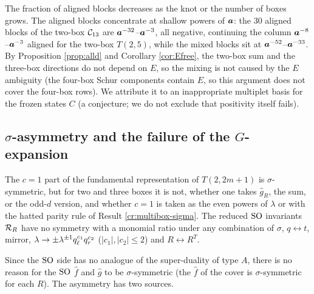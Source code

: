 The fraction of aligned blocks decreases as the knot or the number of boxes grows. The aligned blocks concentrate at shallow powers of $\bm{a}$: the 30 aligned blocks of the two-box $\mathcal{C}_{13}$ are $\bm{a}^{-32}$--$\bm{a}^{-3}$, all negative, continuing the column $\bm{a}^{-8}$--$\bm{a}^{-3}$ aligned for the two-box $T(2,5)$, while the mixed blocks sit at $\bm{a}^{-52}$--$\bm{a}^{-33}$.
By Proposition \ref{prop:alld} and Corollary \ref{cor:Efree}, the two-box sum and the three-box directions do not depend on $E$, so the mixing is not caused by the $E$ ambiguity (the four-box Schur components contain $E$, so this argument does not cover the four-box rows). We attribute it to an inappropriate multiplet basis for the frozen states $C$ (a conjecture; we do not exclude that positivity itself fails).

\subsection{\texorpdfstring{$\sigma$}{sigma}-asymmetry and the failure of the \texorpdfstring{$G$}{G}-expansion}\label{sec:sigmaasym}
\begin{result}\label{cr:noG}
The $c = 1$ part of the fundamental representation of $T(2,2m+1)$ is $\sigma$-symmetric, but for two and three boxes it is not, whether one takes $\hat g_R$, the sum, or the odd-$d$ version, and whether $c = 1$ is taken as the even powers of $\lambda$ or with the hatted parity rule of Result \ref{cr:multibox-sigma}. The reduced $\mathrm{SO}$ invariants $\mathcal{R}_R$ have no symmetry with a monomial ratio under any combination of $\sigma$, $q\leftrightarrow t$, mirror, $\lambda \to \pm\lambda^{\pm1}q_\ell^{c_1}q_r^{c_2}$ ($|c_1|, |c_2| \le 2$) and $R \leftrightarrow R^T$.
\end{result}
Since the $\mathrm{SO}$ side has no analogue of the super-duality of type $A$, there is no reason for the $\mathrm{SO}$ $\hat f$ and $\hat g$ to be $\sigma$-symmetric (the $\hat f$ of the cover is $\sigma$-symmetric for each $R$). The asymmetry has two sources.
